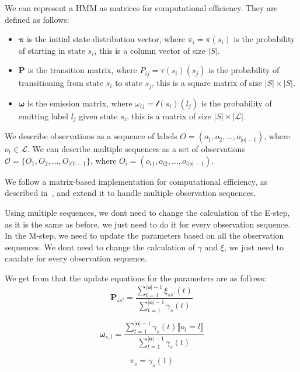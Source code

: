 We can represent a HMM as matrices for computational efficiency.
They are defined as follows:
\begin{itemize}
    \item $\pmb{\pi}$ is the initial state distribution vector, where $\pi_i = \pi(s_i)$ is the probability of starting in state $s_i$, this is a column vector of size $|S|$.
    \item $\pmb{P}$ is the transition matrix, where $P_{ij} = \tau(s_i)(s_j)$ is the probability of transitioning from state $s_i$ to state $s_j$, this is a square matrix of size $|S| \times |S|$.
    \item $\pmb{\omega}$ is the emission matrix, where $\omega_{ij} = \mathscr{l}(s_i)(l_j)$ is the probability of emitting label $l_j$ given state $s_i$, this is a matrix of size $|S| \times |\mathcal{L}|$.
\end{itemize}

We describe observations as a sequence of labels $O = (o_1, o_2, \ldots, o_{|o|-1})$, where $o_t \in \mathcal{L}$.
We can describe multiple sequences as a set of observations $\mathcal{O} = \{O_1, O_2, \ldots, O_{|O|-1}\}$, where $O_i = (o_{i1}, o_{i2}, \ldots, o_{i|o|-1})$.

We follow a matrix-based implementation for computational efficiency, as described in~\cite{aaholmbaum}, and extend it to handle multiple observation sequences.

Using multiple sequences, we dont need to change the calculation of the E-step, as it is the same as before, we just need to do it for every observation sequence.
In the M-step, we need to update the parameters based on all the observation sequences.
We dont need to change the calculation of $\gamma$ and $\xi$, we just need to cacalate for every observation sequence.

We get from \cite{aaholmbaum} that the update equations for the parameters are as follows:
\begin{equation}
    \pmb{P}_{s s'} = \frac{\sum_{t = 1}^{|\mathbf{o}|-1} \xi_{ss'}(t)}{\sum_{t = 1}^{|\mathbf{o}|-1} \gamma_s(t)}
    \label{eq:transition-probabilities}
\end{equation}

\begin{equation}
    \pmb{\omega}_{s, l} = \frac{\sum_{t = 1}^{|\mathbf{o}|-1} \gamma_s(t) \lBrack o_t = l \rBrack}{\sum_{t = 1}^{|\mathbf{o}|-1} \gamma_s(t)}
    \label{eq:omega}
\end{equation}

\begin{equation}
    \pi_s = \gamma_s(1)
    \label{eq:initial-probabilities}
\end{equation}

